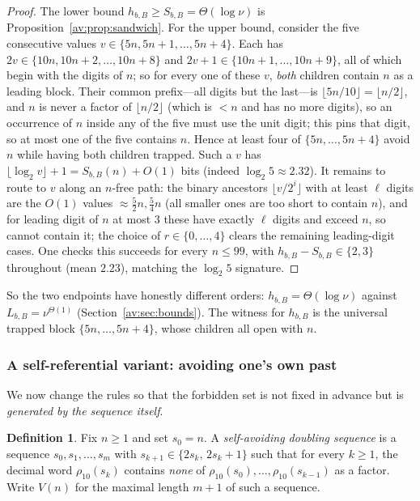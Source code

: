 \documentclass[a4paper]{article}
\theoremstyle{plain}
\theoremstyle{definition}
\newtheorem{definition}{Definition}[subsection]
\theoremstyle{remark}
\newcommand{\Lbb}[1][b,B]{L_{#1}}
\newcommand{\Sbb}[1][b,B]{S_{#1}}
\newcommand{\hbb}[1][b,B]{h_{#1}}
\begin{document}
\begin{proof}
The lower bound $\hbb\ge\Sbb=\Theta(\log\nu)$ is Proposition~\ref{av:prop:sandwich}. For the upper bound, consider the five consecutive values $v\in\{5n,5n+1,\dots,5n+4\}$. Each has $2v\in\{10n,10n+2,\dots,10n+8\}$ and $2v+1\in\{10n+1,\dots,10n+9\}$, all of which begin with the digits of $n$; so for every one of these $v$, \emph{both} children contain $n$ as a leading block. Their common prefix---all digits but the last---is $\lfloor 5n/10\rfloor=\lfloor n/2\rfloor$, and $n$ is never a factor of $\lfloor n/2\rfloor$ (which is $<n$ and has no more digits), so an occurrence of $n$ inside any of the five must use the unit digit; this pins that digit, so at most one of the five contains $n$. Hence at least four of $\{5n,\dots,5n+4\}$ avoid $n$ while having both children trapped. Such a $v$ has $\lfloor\log_2 v\rfloor+1=\Sbb(n)+O(1)$ bits (indeed $\log_2 5\approx2.32$). It remains to route to $v$ along an $n$-free path: the binary ancestors $\lfloor v/2^{i}\rfloor$ with at least $\ell$ digits are the $O(1)$ values $\approx\tfrac52n,\tfrac54n$ (all smaller ones are too short to contain $n$), and for leading digit of $n$ at most $3$ these have exactly $\ell$ digits and exceed $n$, so cannot contain it; the choice of $r\in\{0,\dots,4\}$ clears the remaining leading-digit cases. One checks this succeeds for every $n\le99$, with $\hbb-\Sbb\in\{2,3\}$ throughout (mean $2.23$), matching the $\log_2 5$ signature.
\end{proof}

So the two endpoints have honestly different orders: $\hbb=\Theta(\log\nu)$ against $\Lbb=\nu^{\Theta(1)}$ (Section~\ref{av:sec:bounds}). The witness for $\hbb$ is the universal trapped block $\{5n,\dots,5n+4\}$, whose children all open with $n$.

\subsubsection{A self-referential variant: avoiding one's own past}\label{av:sec:variant}

We now change the rules so that the forbidden set is not fixed in advance but is \emph{generated by the sequence itself}.

\begin{definition}
Fix $n\ge 1$ and set $s_0=n$. A \emph{self-avoiding doubling sequence} is a sequence $s_0,s_1,\dots,s_{m}$ with $s_{k+1}\in\{2s_k,\,2s_k+1\}$ such that for every $k\ge 1$, the decimal word $\rho_{10}(s_k)$ contains \emph{none} of $\rho_{10}(s_0),\dots,\rho_{10}(s_{k-1})$ as a factor. Write $V(n)$ for the maximal length $m+1$ of such a sequence.
\end{definition}
\end{document}
